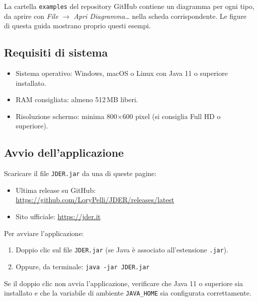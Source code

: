 \documentclass[a4paper,11pt]{article}
\newcommand{\menu}[1]{\textit{#1}}
\begin{document}
\begin{tcolorbox}[tipbox, title={Diagrammi di esempio}]
  La cartella \texttt{examples} del repository GitHub contiene un diagramma per ogni tipo, da
  aprire con \menu{File} $\to$ \menu{Apri Diagramma\ldots} nella scheda corrispondente. Le figure
  di questa guida mostrano proprio questi esempi.
\end{tcolorbox}

\subsection{Requisiti di sistema}

\begin{itemize}
  \item Sistema operativo: Windows, macOS o Linux con Java 11 o superiore installato.
  \item RAM consigliata: almeno 512\,MB liberi.
  \item Risoluzione schermo: minima 800$\times$600 pixel (si consiglia Full HD o superiore).
\end{itemize}

\subsection{Avvio dell'applicazione}

Scaricare il file \texttt{JDER.jar} da una di queste pagine:
\begin{itemize}
  \item Ultima release su GitHub: \url{https://github.com/LoryPelli/JDER/releases/latest}
  \item Sito ufficiale: \url{https://jder.it}
\end{itemize}

Per avviare l'applicazione:
\begin{enumerate}
  \item Doppio clic sul file \texttt{JDER.jar} (se Java è associato all'estensione \texttt{.jar}).
  \item Oppure, da terminale: \texttt{java -jar JDER.jar}
\end{enumerate}

\begin{tcolorbox}[warnbox, title={Attenzione}]
  Se il doppio clic non avvia l'applicazione, verificare che Java 11 o superiore sia installato
  e che la variabile di ambiente \texttt{JAVA\_HOME} sia configurata correttamente.
\end{tcolorbox}
\end{document}
